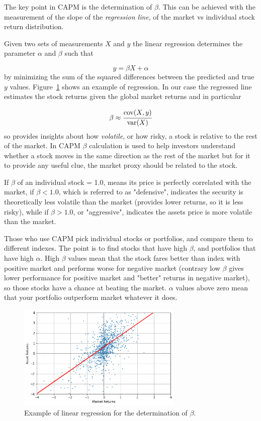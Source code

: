 The key point in CAPM is the determination of $\beta$. This can be achieved with the measurement of the slope of the \emph{regression line}, of the market vs individual stock return distribution.

Given two sets of measurements $X$ and $y$ the linear regression determines the parameter $\alpha$ and $\beta$ such that

\begin{equation}
	y=\beta X + \alpha
\end{equation}
by minimizing the sum of the squared differences between the predicted and true $y$ values.
Figure~\ref{fig:linear_regression} shows an example of regression. 
In our case the regressed line estimates the stock returns given the global market returns and in particular 

\begin{equation}
	\beta \approx \cfrac{\textrm{cov}(X,y)}{\textrm {var}(X)}
\end{equation}
so provides insights about how \emph{volatile}, or how risky, a stock is relative to the rest of the market.
In CAPM $\beta$ calculation is used to help investors understand whether a stock moves in the same direction as the rest of the market but for it to provide any useful clue, the market proxy should be related to the stock.

If $\beta$ of an individual stock = 1.0, means its price is perfectly correlated with the market, if $\beta < 1.0$, which is referred to as "defensive", indicates the security is theoretically less volatile than the market (provides lower returns, so it is less risky), while if $\beta > 1.0$, or "aggressive", indicates the assets price is more volatile than the market.

Those who use CAPM pick individual stocks or portfolios, and compare them to different indexes. The point is to find stocks that have high $\beta$, and portfolios that have high $\alpha$. High $\beta$ values mean that the stock fares better than index with positive market and performs worse for negative market (contrary low $\beta$ gives lower performance for positive market and "better" returns in negative market), so those stocks have a chance at beating the market. $\alpha$ values above zero mean that your portfolio outperform market whatever it does.

\begin{figure}[htb]
	\centering
	\includegraphics[width=0.7\textwidth]{figures/linear_regression}
	\caption{Example of linear regression for the determination of $\beta$.}
	\label{fig:linear_regression}
\end{figure}

